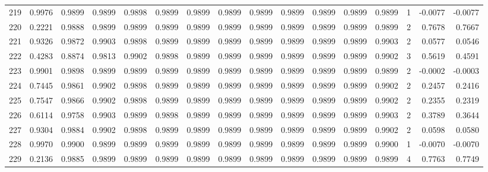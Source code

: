 \begin{tabular}{lrrrrrrrrrrrrrrr}
219 &      0.9976 &  0.9899 &  0.9899 &  0.9898 &  0.9899 &  0.9899 &  0.9899 &  0.9899 &  0.9899 &  0.9899 &   0.9899 &     0.9899 &      1 &                   -0.0077 &                    -0.0077 \\
220 &      0.2221 &  0.9888 &  0.9899 &  0.9899 &  0.9899 &  0.9899 &  0.9899 &  0.9899 &  0.9899 &  0.9899 &   0.9899 &     0.9899 &      2 &                    0.7678 &                     0.7667 \\
221 &      0.9326 &  0.9872 &  0.9903 &  0.9898 &  0.9899 &  0.9899 &  0.9899 &  0.9899 &  0.9899 &  0.9899 &   0.9899 &     0.9903 &      2 &                    0.0577 &                     0.0546 \\
222 &      0.4283 &  0.8874 &  0.9813 &  0.9902 &  0.9898 &  0.9899 &  0.9899 &  0.9899 &  0.9899 &  0.9899 &   0.9899 &     0.9902 &      3 &                    0.5619 &                     0.4591 \\
223 &      0.9901 &  0.9898 &  0.9899 &  0.9899 &  0.9899 &  0.9899 &  0.9899 &  0.9899 &  0.9899 &  0.9899 &   0.9899 &     0.9899 &      2 &                   -0.0002 &                    -0.0003 \\
224 &      0.7445 &  0.9861 &  0.9902 &  0.9898 &  0.9899 &  0.9899 &  0.9899 &  0.9899 &  0.9899 &  0.9899 &   0.9899 &     0.9902 &      2 &                    0.2457 &                     0.2416 \\
225 &      0.7547 &  0.9866 &  0.9902 &  0.9898 &  0.9899 &  0.9899 &  0.9899 &  0.9899 &  0.9899 &  0.9899 &   0.9899 &     0.9902 &      2 &                    0.2355 &                     0.2319 \\
226 &      0.6114 &  0.9758 &  0.9903 &  0.9899 &  0.9898 &  0.9899 &  0.9899 &  0.9899 &  0.9899 &  0.9899 &   0.9899 &     0.9903 &      2 &                    0.3789 &                     0.3644 \\
227 &      0.9304 &  0.9884 &  0.9902 &  0.9898 &  0.9899 &  0.9899 &  0.9899 &  0.9899 &  0.9899 &  0.9899 &   0.9899 &     0.9902 &      2 &                    0.0598 &                     0.0580 \\
228 &      0.9970 &  0.9900 &  0.9899 &  0.9899 &  0.9899 &  0.9899 &  0.9899 &  0.9899 &  0.9899 &  0.9899 &   0.9899 &     0.9900 &      1 &                   -0.0070 &                    -0.0070 \\
229 &      0.2136 &  0.9885 &  0.9899 &  0.9899 &  0.9899 &  0.9899 &  0.9899 &  0.9899 &  0.9899 &  0.9899 &   0.9899 &     0.9899 &      4 &                    0.7763 &                     0.7749 \\

\end{tabular}
